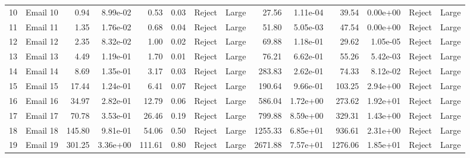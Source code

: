 \begin{tabular}{llrrrrllrrrrll}
10 &  Email 10 &               0.94 &  8.99e-02 &                0.53 &  0.03 &   Reject &       Large &                    27.56 &  1.11e-04 &                     39.54 &  0.00e+00 &  Reject &       Large \\
11 &  Email 11 &               1.35 &  1.76e-02 &                0.68 &  0.04 &   Reject &       Large &                    51.80 &  5.05e-03 &                     47.54 &  0.00e+00 &  Reject &       Large \\
12 &  Email 12 &               2.35 &  8.32e-02 &                1.00 &  0.02 &   Reject &       Large &                    69.88 &  1.18e-01 &                     29.62 &  1.05e-05 &  Reject &       Large \\
13 &  Email 13 &               4.49 &  1.19e-01 &                1.70 &  0.01 &   Reject &       Large &                    76.21 &  6.62e-01 &                     55.26 &  5.42e-03 &  Reject &       Large \\
14 &  Email 14 &               8.69 &  1.35e-01 &                3.17 &  0.03 &   Reject &       Large &                   283.83 &  2.62e-01 &                     74.33 &  8.12e-02 &  Reject &       Large \\
15 &  Email 15 &              17.44 &  1.24e-01 &                6.41 &  0.07 &   Reject &       Large &                   190.64 &  9.66e-01 &                    103.25 &  2.94e+00 &  Reject &       Large \\
16 &  Email 16 &              34.97 &  2.82e-01 &               12.79 &  0.06 &   Reject &       Large &                   586.04 &  1.72e+00 &                    273.62 &  1.92e+01 &  Reject &       Large \\
17 &  Email 17 &              70.78 &  3.53e-01 &               26.46 &  0.19 &   Reject &       Large &                   799.88 &  8.59e+00 &                    329.31 &  1.43e+00 &  Reject &       Large \\
18 &  Email 18 &             145.80 &  9.81e-01 &               54.06 &  0.50 &   Reject &       Large &                  1255.33 &  6.85e+01 &                    936.61 &  2.31e+00 &  Reject &       Large \\
19 &  Email 19 &             301.25 &  3.36e+00 &              111.61 &  0.80 &   Reject &       Large &                  2671.88 &  7.57e+01 &                   1276.06 &  1.85e+01 &  Reject &       Large \\
\bottomrule
\end{tabular}
